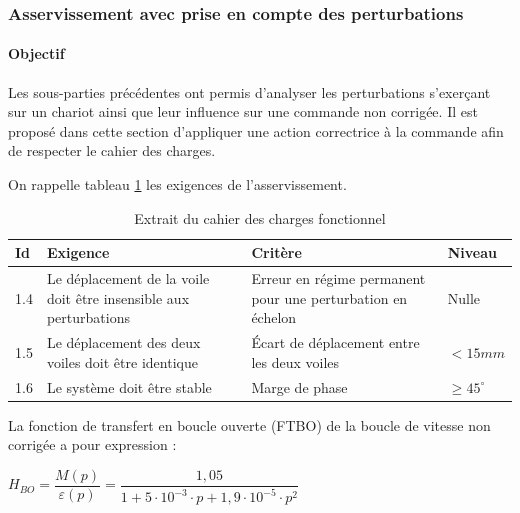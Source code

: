 
\subsubsection{Asservissement avec prise en compte des perturbations}

\paragraph{Objectif} Les sous-parties précédentes ont permis d'analyser les perturbations s'exerçant sur un chariot ainsi que leur influence sur une commande non corrigée. Il est proposé dans cette section d'appliquer une action correctrice à la commande afin de respecter le cahier des charges.

On rappelle tableau \ref{tab03} les exigences de l'asservissement.

\begin{table}[ht!]
\begin{tabular}{|p{}|p{}|p{}|p{}|}
\hline
Id & Exigence & Critère & Niveau\\
\hline
1.4 & Le déplacement de la voile doit être insensible aux perturbations & Erreur en régime permanent pour une perturbation en échelon & Nulle\\
\hline
1.5 & Le déplacement des deux voiles doit être identique & Écart de déplacement entre
les deux voiles & $<15mm$ \\
\hline
1.6 & Le système doit être stable & Marge de phase & $\geq 45^{\circ}$\\
\hline
\end{tabular}
\caption{\label{tab03}Extrait du cahier des charges fonctionnel}
\end{table}

La fonction de transfert en boucle ouverte (FTBO) de la boucle de vitesse non corrigée a pour expression :

\begin{center}
$H_{BO}=\dfrac{M(p)}{\varepsilon(p)}=\dfrac{1,05}{1+5\cdot 10^{-3}\cdot p+1,9\cdot 10^{-5}\cdot p^2}$
\end{center}



